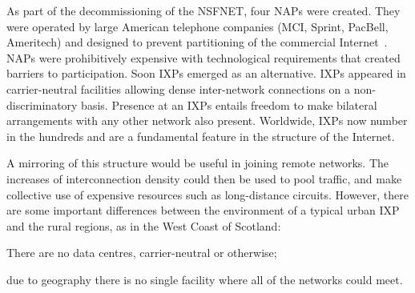 

As part of the decommissioning of the \acs{NSFNET},
four \acp{NAP} were created. They were operated by large
American telephone companies (MCI, Sprint, PacBell, Ameritech) and
designed to prevent partitioning of the commercial
Internet~\cite{Ager:2012,Chatzis:2013}.
\acp{NAP} were prohibitively expensive with
technological requirements that created barriers to participation.
Soon \acp{IXP} emerged as an alternative. \acp{IXP} appeared in
carrier-neutral facilities allowing dense inter-network connections on
a non-discriminatory basis. Presence at an \acp{IXP} entails freedom
to make bilateral arrangements with any other network also
present. Worldwide, \acp{IXP} now number in the hundreds and are a
fundamental feature in the structure of the Internet.



A mirroring of this structure would be useful in joining remote
networks. The increases of interconnection density could then
be used to pool traffic, and make collective use of expensive resources
such as long-distance circuits. However, there are some important
differences between the environment of a typical urban \ac{IXP} and
the rural regions, as in the West Coast of Scotland:
\begin{inparaenum}[(i)]
  \item There are no data centres, carrier-neutral or otherwise;
  \item due to geography there is no single facility where all of the
    networks could meet.
\end{inparaenum}
